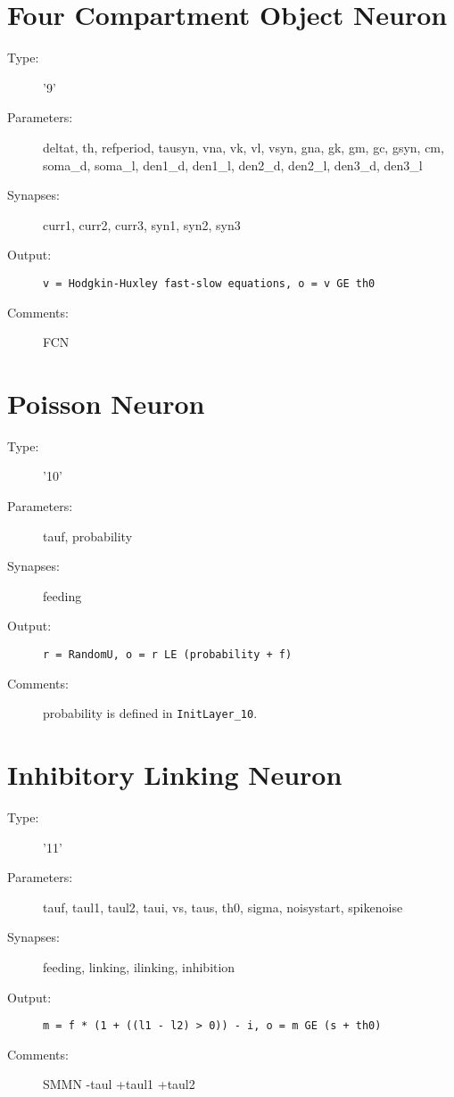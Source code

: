 \documentclass[12pt]{article}
\begin{document}
\section{Four Compartment Object Neuron}
\begin{description}
\item[Type:] '9'

\item[Parameters:] deltat, th, refperiod, tausyn, vna, vk, vl, vsyn, gna, gk, gm,
              gc, gsyn, cm, soma\_d, soma\_l, den1\_d, den1\_l, den2\_d, den2\_l,
              den3\_d, den3\_l

\item[Synapses:] curr1, curr2, curr3, syn1, syn2, syn3

\item[Output:] \texttt{v = Hodgkin-Huxley fast-slow equations, o = v GE th0}

\item[Comments:] FCN
\end{description}



\section{Poisson Neuron}
\begin{description}
\item[Type:] '10'

\item[Parameters:] tauf, probability

\item[Synapses:] feeding

\item[Output:] \texttt{r = RandomU, o = r LE (probability + f)}

\item[Comments:] probability is defined in \texttt{InitLayer\_10}.
\end{description}



\section{Inhibitory Linking Neuron}
\begin{description}
\item[Type:] '11'

\item[Parameters:] tauf, taul1, taul2, taui, vs, taus, th0, sigma, noisystart, 
              spikenoise

\item[Synapses:] feeding, linking, ilinking, inhibition

\item[Output:] \texttt{m = f * (1 + ((l1 - l2) > 0)) - i, o = m GE (s + th0)}

\item[Comments:] SMMN -taul +taul1 +taul2 
\end{description}
\end{document}
